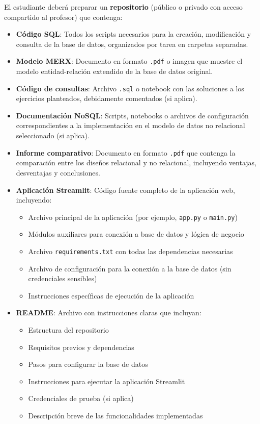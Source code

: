 \documentclass[10pt]{article}
\begin{document}
	El estudiante deberá preparar un \textbf{repositorio} (público o privado con acceso compartido al profesor) que contenga:
	
	\begin{itemize}
		\item \textbf{Código SQL}: Todos los scripts necesarios para la creación, modificación y consulta de la base de datos, organizados por tarea en carpetas separadas.
		
		\item \textbf{Modelo MERX}: Documento en formato \texttt{.pdf} o imagen que muestre el modelo entidad-relación extendido de la base de datos original.
		
		\item \textbf{Código de consultas}: Archivo \texttt{.sql} o notebook con las soluciones a los ejercicios planteados, debidamente comentados (si aplica).
		
		\item \textbf{Documentación NoSQL}: Scripts, notebooks o archivos de configuración correspondientes a la implementación en el modelo de datos no relacional seleccionado (si aplica).
		
		\item \textbf{Informe comparativo}: Documento en formato \texttt{.pdf} que contenga la comparación entre los diseños relacional y no relacional, incluyendo ventajas, desventajas y conclusiones.
		
		\item \textbf{Aplicación Streamlit}: Código fuente completo de la aplicación web, incluyendo:
		\begin{itemize}
			\item Archivo principal de la aplicación (por ejemplo, \texttt{app.py} o \texttt{main.py})
			\item Módulos auxiliares para conexión a base de datos y lógica de negocio
			\item Archivo \texttt{requirements.txt} con todas las dependencias necesarias
			\item Archivo de configuración para la conexión a la base de datos (sin credenciales sensibles)
			\item Instrucciones específicas de ejecución de la aplicación
		\end{itemize}
		
		\item \textbf{README}: Archivo con instrucciones claras que incluyan:
		\begin{itemize}
			\item Estructura del repositorio
			\item Requisitos previos y dependencias
			\item Pasos para configurar la base de datos
			\item Instrucciones para ejecutar la aplicación Streamlit
			\item Credenciales de prueba (si aplica)
			\item Descripción breve de las funcionalidades implementadas
		\end{itemize}
		

\end{itemize}
\end{document}
